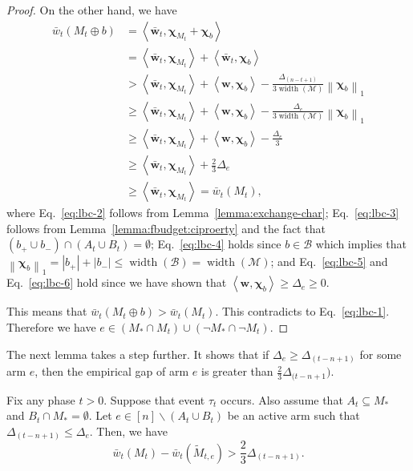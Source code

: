 \documentclass{article}
\newcommand{\M}{\mathcal M}
\newcommand{\B}{\mathcal B}
\newcommand{\del}{\backslash}
\DeclareMathOperator{\rank}{width}
\newcommand{\inn}[1]{\left\langle #1 \right\rangle}
\newcommand{\nor}[1]{\left\|#1\right\|}
\renewcommand{\vec}[1]{\boldsymbol{#1}}
\begin{document}
\begin{proof}
On the other hand, we have
\begin{align}
\bar w_t(M_t\oplus b) &= \inn{\vec{\bar w}_t, \vec \chi_{M_t} + \vec \chi_b} \label{eq:lbc-2}\\
									    &= \inn{\vec{\bar w}_t, \vec \chi_{M_t}} + \inn{\vec{\bar w}_t, \vec \chi_b}\nonumber\\
									    &> \inn{\vec{\bar w}_t, \vec \chi_{M_t}} + \inn{\vec w,\vec\chi_b} - \frac{\Delta_{(n-t+1)}}{3\rank(\M)} \nor{\vec\chi_b}_1 \label{eq:lbc-3} \\
										  &\ge \inn{\vec{\bar w}_t, \vec \chi_{M_t}} + \inn{\vec w,\vec\chi_b} - \frac{\Delta_{e}}{3\rank(\M)} \nor{\vec\chi_b}_1
										  \nonumber\\
										  &\ge \inn{\vec{\bar w}_t, \vec \chi_{M_t}} + \inn{\vec w,\vec\chi_b} - \frac{\Delta_e}{3}
										  \label{eq:lbc-4}\\
										  &\ge \inn{\vec{\bar w}_t, \vec \chi_{M_t}} + \frac{2}3 \Delta_e \label{eq:lbc-5}\\
										  &\ge \inn{\vec{\bar w}_t, \vec \chi_{M_t}} = \bar w_t(M_t), \label{eq:lbc-6}
\end{align}
where Eq.~\eqref{eq:lbc-2} follows from Lemma~\ref{lemma:exchange-char};
Eq.~\eqref{eq:lbc-3} follows from Lemma~\ref{lemma:fbudget:ciproerty} and the fact that $(b_+\cup b_-)\cap (A_t\cup B_t)=\emptyset$;
Eq.~\eqref{eq:lbc-4} holds since $b\in \B$ which implies that $\nor{\vec\chi_b}_1 = |b_+|+|b_-|\le\rank(\B)=\rank(\M)$;
and Eq.~\eqref{eq:lbc-5} and Eq.~\eqref{eq:lbc-6} hold since we have shown that $\inn{\vec w, \vec \chi_b} \ge \Delta_e \ge 0$.

This means that $\bar w_t(M_t \oplus b) > \bar w_t(M_t)$. 
This contradicts to Eq.~\eqref{eq:lbc-1}.
Therefore we have $e\in (M_* \cap M_t) \cup ( \neg M_* \cap \neg M_t)$.
\end{proof}

The next lemma takes a step further.
It shows that if $\Delta_e \ge \Delta_{(t-n+1)}$ for some arm $e$, then the empirical gap of arm $e$ is greater than $\frac23 \Delta_{(t-n+1})$.
\begin{lemma}
\label{lemma-budget-c}
Fix any phase $t>0$. 
Suppose that event $\tau_t$ occurs.
Also assume that $A_t \subseteq M_*$ and $B_t \cap M_* = \emptyset$.
Let $e \in [n] \del (A_t\cup B_t)$ be an active arm such that $\Delta_{(t-n+1)} \le \Delta_e$.
Then, we have 
$$
\bar w_t(M_t) - \bar w_t(\tilde M_{t,e}) > \frac23 \Delta_{(t-n+1)}.
$$
\end{lemma}
\end{document}
